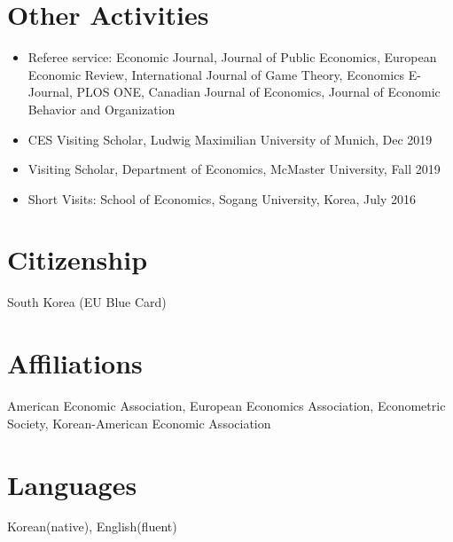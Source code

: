 \documentclass[margin, letterpaper]{res}
\begin{document}
\begin{resume}

\section{Other Activities}
\begin{itemize}
\item Referee service: Economic Journal, Journal of Public Economics, European Economic Review, International Journal of Game Theory, Economics E-Journal, PLOS ONE, Canadian Journal of Economics, Journal of Economic Behavior and Organization
\item CES Visiting Scholar, Ludwig Maximilian University of Munich, Dec 2019
\item Visiting Scholar, Department of Economics, McMaster University, Fall 2019
\item Short Visits: School of Economics, Sogang University, Korea, July 2016
\end{itemize}

\section{Citizenship} South Korea (EU Blue Card)%

\section{Affiliations} American Economic Association, European Economics Association, Econometric Society, Korean-American Economic Association

\section{Languages} Korean(native), English(fluent)


\end{resume}
\end{document}
